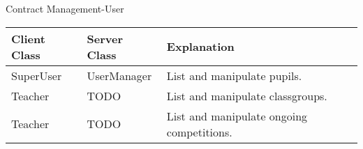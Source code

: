 \begin{subsubsection}{Contract Management-User}
	\begin{tabular}{l l l }
	    Client Class & Server Class & Explanation\\ \hline
        SuperUser & UserManager & List and manipulate pupils. \\
        Teacher & TODO & List and manipulate classgroups. \\
        Teacher & TODO & List and manipulate ongoing competitions.
	\end{tabular}
\end{subsubsection}
